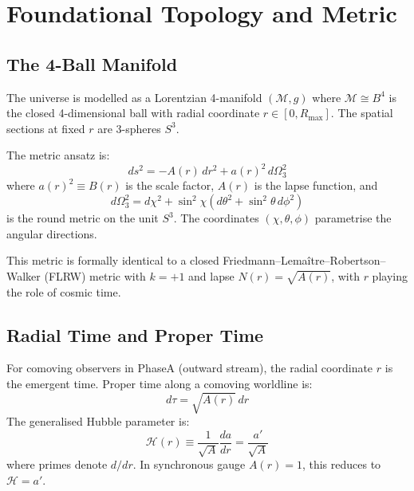 \documentclass[10pt,twocolumn]{article}
\theoremstyle{definition}
\newcommand{\Rmax}{R_{\max}}
\newcommand{\Hcal}{\mathcal{H}}
\newcommand{\dOmega}{d\Omega_{3}^{2}}
\begin{document}
\section{Foundational Topology and Metric}
\label{sec:topology}

\subsection{The 4-Ball Manifold}

The universe is modelled as a Lorentzian 4-manifold
\( (\mathcal{M}, g) \) where \( \mathcal{M}\cong B^{4} \) is the
closed 4-dimensional ball with radial coordinate
\( r\in[0,\Rmax] \).  The spatial sections at fixed \( r \) are
3-spheres \( S^{3} \).

The metric ansatz is:
\begin{equation}
  ds^{2} = -A(r)\,dr^{2} + a(r)^{2}\,\dOmega
  \label{eq:metric}
\end{equation}
where \( a(r)^{2}\equiv B(r) \) is the scale factor,
\( A(r) \) is the lapse function, and
\begin{equation}
  \dOmega = d\chi^{2}
    + \sin^{2}\!\chi\!\left(d\theta^{2}
    + \sin^{2}\!\theta\,d\phi^{2}\right)
\end{equation}
is the round metric on the unit \( S^{3} \).  The coordinates
\( (\chi,\theta,\phi) \) parametrise the angular directions.

This metric is formally identical to a closed
Friedmann--Lema\^{i}tre--Robertson--Walker (FLRW) metric
with \( k=+1 \) and lapse \( N(r)=\sqrt{A(r)} \), with \( r \)
playing the role of cosmic time.

\subsection{Radial Time and Proper Time}

For comoving observers in Phase\nobreakspace{}A (outward stream), the
radial coordinate \( r \) is the emergent time.  Proper time
along a comoving worldline is:
\begin{equation}
  d\tau = \sqrt{A(r)}\,dr
\end{equation}
The generalised Hubble parameter is:
\begin{equation}
  \Hcal(r) \equiv \frac{1}{\sqrt{A}}\frac{da}{dr}
  = \frac{a'}{\sqrt{A}}
\end{equation}
where primes denote \( d/dr \).  In synchronous gauge
\( A(r)=1 \), this reduces to \( \Hcal=a' \).
\end{document}
